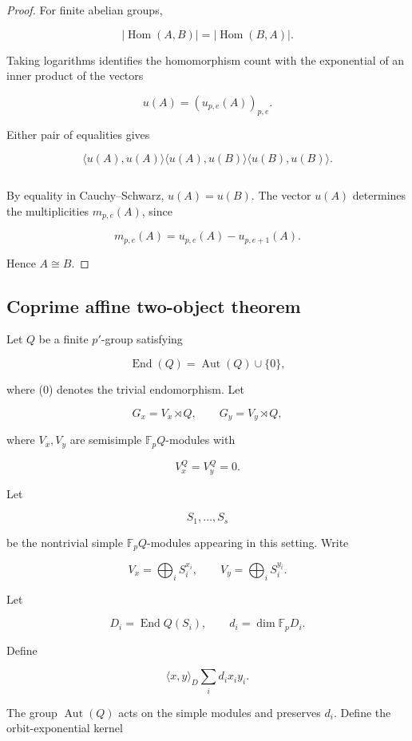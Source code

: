 \documentclass[11pt]{article}
\begin{document}
\begin{proof}
For finite abelian groups,

\[
|\operatorname{Hom}(A,B)|=|\operatorname{Hom}(B,A)|.
\]

Taking logarithms identifies the homomorphism count with the exponential of an inner product of the vectors

\[
u(A)=(u_{p,e}(A))_{p,e}.
\]

Either pair of equalities gives

\[
\langle u(A),u(A)\rangle
\langle u(A),u(B)\rangle
\langle u(B),u(B)\rangle.
\]

\[
\]

By equality in Cauchy--Schwarz, $u(A)=u(B)$. The vector $u(A)$ determines the multiplicities $m_{p,e}(A)$, since

\[
m_{p,e}(A)=u_{p,e}(A)-u_{p,e+1}(A).
\]

Hence $A\cong B$.

\end{proof}

\subsection{Coprime affine two-object theorem}

Let $Q$ be a finite $p'$-group satisfying

\[
\operatorname{End}(Q)=\operatorname{Aut}(Q)\cup\{0\},
\]

where (0) denotes the trivial endomorphism. Let

\[
G_x=V_x\rtimes Q,
\qquad
G_y=V_y\rtimes Q,
\]

where $V_x,V_y$ are semisimple $\mathbb F_pQ$-modules with

\[
V_x^Q=V_y^Q=0.
\]

Let

\[
S_1,\ldots,S_s
\]

be the nontrivial simple $\mathbb F_pQ$-modules appearing in this setting. Write

\[
V_x=\bigoplus_i S_i^{x_i},
\qquad
V_y=\bigoplus_i S_i^{y_i}.
\]

Let

\[
D_i=\operatorname{End}
Q(S_i),
\qquad
d_i=\dim
{\mathbb F_p}D_i.
\]

Define

\[
\langle x,y\rangle_D
\sum_i d_ix_iy_i.
\]

The group $\operatorname{Aut}(Q)$ acts on the simple modules and preserves $d_i$. Define the orbit-exponential kernel
\end{document}
